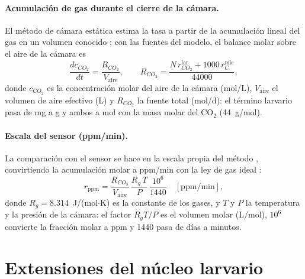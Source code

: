 \documentclass[11pt,a4paper]{article}
\begin{document}
\paragraph{Acumulación de gas durante el cierre de la cámara.}
El método de cámara estática estima la tasa a partir de la acumulación lineal del gas en un volumen conocido \parencite{hutchinsonMethodsSoilAnalysis1992}; con las fuentes del modelo, el balance molar sobre el aire de la cámara es
\begin{equation}
\frac{dc_{CO_2}}{dt} = \frac{R_{CO_2}}{V_{\mathrm{aire}}},
\qquad
R_{CO_2} = \frac{N\,r_{CO_2}^{\mathrm{lar}} + 1000\,r_C^{\mathrm{mic}}}{44000},
\label{eq:camara}
\end{equation}
donde $c_{CO_2}$ es la concentración molar del aire de la cámara (mol/L), $V_{\mathrm{aire}}$ el volumen de aire efectivo (L) y $R_{CO_2}$ la fuente total (mol/d): el término larvario pasa de mg a g y ambos a mol con la masa molar del CO$_2$ (44~g/mol).

\paragraph{Escala del sensor (ppm/min).}
La comparación con el sensor se hace en la escala propia del método \parencite{hutchinsonMethodsSoilAnalysis1992}, convirtiendo la acumulación molar a ppm/min con la ley de gas ideal \parencite{atkinsPhysicalChemistry2014}:
\begin{equation}
r_{\mathrm{ppm}} = \frac{R_{CO_2}}{V_{\mathrm{aire}}}\,\frac{R_g\,T}{P}\,\frac{10^6}{1440}
\quad [\mathrm{ppm/min}],
\label{eq:ppm}
\end{equation}
donde $R_g = 8.314$~J/(mol$\cdot$K) es la constante de los gases, y $T$ y $P$ la temperatura y la presión de la cámara: el factor $R_g T/P$ es el volumen molar (L/mol), $10^6$ convierte la fracción molar a ppm y 1440 pasa de días a minutos.

\section{Extensiones del núcleo larvario}
\label{sec:nucleoext}
\end{document}
